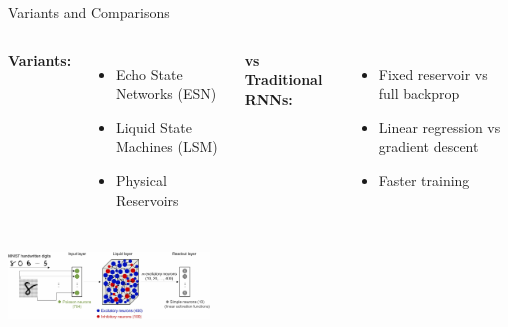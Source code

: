 \documentclass{beamer}
\begin{document}
\begin{frame}{Variants and Comparisons}
  \begin{columns}
    \textbf{Variants:}
    \begin{itemize}
      \item Echo State Networks (ESN)
      \item Liquid State Machines (LSM)
      \item Physical Reservoirs
    \end{itemize}
    
    \textbf{vs Traditional RNNs:}
    \begin{itemize}
      \item Fixed reservoir vs full backprop
      \item Linear regression vs gradient descent
      \item Faster training
    \end{itemize}
  \end{columns}
  \vspace{5mm}
  \centering
  \includegraphics[width=0.4\textwidth]{figures/lsm_diag.png}
\end{frame}
\end{document}
